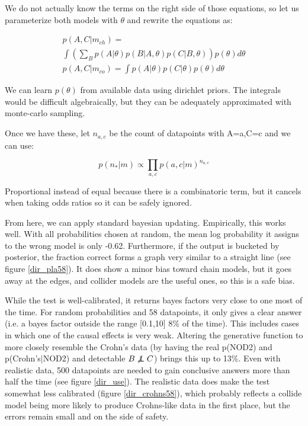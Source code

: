 \documentclass[twocolumn,12pt]{article}
\newcommand\indep{\protect\mathpalette{\protect\independenT}{\perp}}
\def\independenT#1#2{\mathrel{\rlap{$#1#2$}\mkern2mu{#1#2}}}
\begin{document}
We do not actually know the terms on the right side of those
equations, so let us parameterize both models with $\theta$ and
rewrite the equations as:


\begin{multline*}
  p(A,C|m_{ch}) = \\
  \int \left ( \sum_B p(A|\theta) p(B|A,\theta) 
  p(C|B,\theta) \right ) p(\theta) d\theta \\
  p(A,C|m_{co}) = \int p(A|\theta)p(C|\theta)p(\theta) d\theta
\end{multline*}

We can learn $p(\theta)$ from available data using dirichlet priors.
The integrals would be difficult algebraically, but they can be
adequately approximated with monte-carlo sampling.

Once we have these, let $n_{a,c}$ be the count of datapoints with
A=a,C=c and we can use:

\begin{equation*}
p(n_*|m) \propto \prod_{a,c} p(a,c|m)^{n_{a,c}}
\end{equation*}

Proportional instead of equal because there is a combinatoric term,
but it cancels when taking odds ratios so it can be safely ignored.

From here, we can apply standard bayesian updating.  Empirically, this
works well.  With all probabilities chosen at random, the mean log
probability it assigns to the wrong model is only -0.62.  Furthermore,
if the output is bucketed by posterior, the fraction correct forms a
graph very similar to a straight line (see figure \ref{dir_pla58}).
It does show a minor bias toward chain models, but it goes away at the
edges, and collider models are the useful ones, so this is a safe bias.

While the test is well-calibrated, it returns bayes factors very close
to one most of the time.  For random probabilities and 58 datapoints,
it only gives a clear answer (i.e. a bayes factor outside the range
[0.1,10] 8\% of the time).  This includes cases in which one of the
causal effects is very weak.  Altering the generative function to more
closely resemble the Crohn's data (by having the real p(NOD2) and
p(Crohn's$|$NOD2) and detectable $B\not\indep C$) brings this up to
13\%.  Even with realistic data, 500 datapoints are needed to gain
conclusive answers more than half the time (see figure
\ref{dir_use}).  The realistic data does make the test somewhat less
calibrated (figure \ref{dir_crohns58}), which probably reflects a
collide model being more likely to produce Crohns-like data in the
first place, but the errors remain small and on the side of safety.
\end{document}
